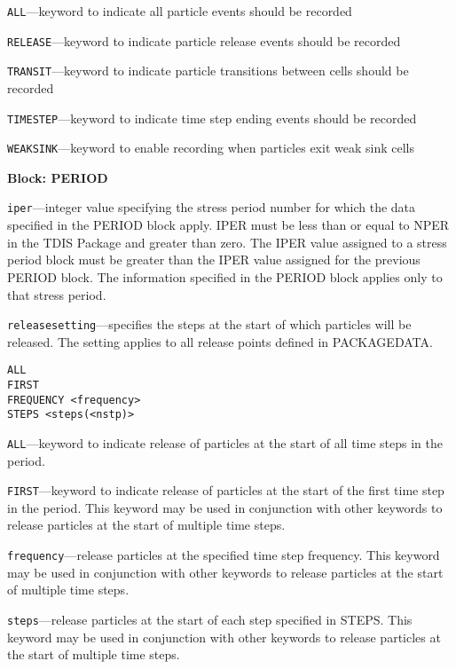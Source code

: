 \begin{description}
\item \texttt{ALL}---keyword to indicate all particle events should be recorded

\item \texttt{RELEASE}---keyword to indicate particle release events should be recorded

\item \texttt{TRANSIT}---keyword to indicate particle transitions between cells should be recorded

\item \texttt{TIMESTEP}---keyword to indicate time step ending events should be recorded

\item \texttt{WEAKSINK}---keyword to enable recording when particles exit weak sink cells

\end{description}
\item \textbf{Block: PERIOD}

\begin{description}
\item \texttt{iper}---integer value specifying the stress period number for which the data specified in the PERIOD block apply. IPER must be less than or equal to NPER in the TDIS Package and greater than zero. The IPER value assigned to a stress period block must be greater than the IPER value assigned for the previous PERIOD block. The information specified in the PERIOD block applies only to that stress period.

\item \texttt{releasesetting}---specifies the steps at the start of which particles will be released.  The setting applies to all release points defined in PACKAGEDATA.

\begin{lstlisting}[style=blockdefinition]
ALL
FIRST
FREQUENCY <frequency>
STEPS <steps(<nstp)>
\end{lstlisting}

\item \texttt{ALL}---keyword to indicate release of particles at the start of all time steps in the period.

\item \texttt{FIRST}---keyword to indicate release of particles at the start of the first time step in the period. This keyword may be used in conjunction with other keywords to release particles at the start of multiple time steps.

\item \texttt{frequency}---release particles at the specified time step frequency. This keyword may be used in conjunction with other keywords to release particles at the start of multiple time steps.

\item \texttt{steps}---release particles at the start of each step specified in STEPS. This keyword may be used in conjunction with other keywords to release particles at the start of multiple time steps.

\end{description}

